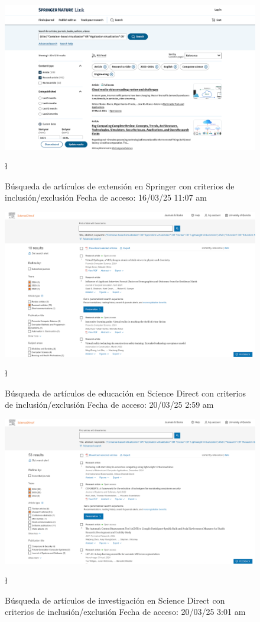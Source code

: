 \FloatBarrier\begin{figure}[H]
    \centering
    \includegraphics[width=\textwidth,keepaspectratio]{apendices/BD/criterios/Springer-ind.png}
    \caption{Búsqueda de artículos de extensión en Springer con criterios de inclusión/exclusión
    Fecha de acceso: 16/03/25 11:07 am
    }\l
\end{figure}
\FloatBarrier\begin{figure}[H]
    \centering
    \includegraphics[width=\textwidth,keepaspectratio]{apendices/BD/criterios/SD-ed.png}
    \caption{Búsqueda de artículos de educación en Science Direct con criterios de inclusión/exclusión
    Fecha de acceso: 20/03/25 2:59 am
    }\l
\end{figure}
\FloatBarrier\begin{figure}[H]
    \centering
    \includegraphics[width=\textwidth,keepaspectratio]{apendices/BD/criterios/SD-inv.png}
    \caption{Búsqueda de artículos de investigación en Science Direct con criterios de inclusión/exclusión
    Fecha de acceso: 20/03/25 3:01 am
    }\l
\end{figure}

